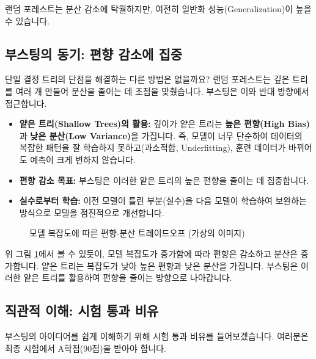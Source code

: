 \documentclass[11pt,a4paper]{book}
\theoremstyle{definition}
\begin{document}
랜덤 포레스트는 분산 감소에 탁월하지만, 여전히 일반화 성능(Generalization)이 높을 수 있습니다.

\subsection{부스팅의 동기: 편향 감소에 집중}
단일 결정 트리의 단점을 해결하는 다른 방법은 없을까요? 랜덤 포레스트는 깊은 트리를 여러 개 만들어 분산을 줄이는 데 초점을 맞췄습니다. 부스팅은 이와 반대 방향에서 접근합니다.

\begin{tcolorbox}[summary, title={부스팅의 핵심 동기}] %
\begin{itemize}
    \item \textbf{얕은 트리(Shallow Trees)의 활용:} 깊이가 얕은 트리는 \textbf{높은 편향(High Bias)}과 \textbf{낮은 분산(Low Variance)}을 가집니다. 즉, 모델이 너무 단순하여 데이터의 복잡한 패턴을 잘 학습하지 못하고(과소적합, Underfitting), 훈련 데이터가 바뀌어도 예측이 크게 변하지 않습니다.
    \item \textbf{편향 감소 목표:} 부스팅은 이러한 얕은 트리의 높은 편향을 줄이는 데 집중합니다.
    \item \textbf{실수로부터 학습:} 이전 모델이 틀린 부분(실수)을 다음 모델이 학습하여 보완하는 방식으로 모델을 점진적으로 개선합니다.
\end{itemize}
\end{tcolorbox}

\begin{figure}[h!]
    \centering
    \caption{모델 복잡도에 따른 편향-분산 트레이드오프 (가상의 이미지)}
    \label{fig:bias_variance_tradeoff}
\end{figure}

위 그림 \ref{fig:bias_variance_tradeoff}에서 볼 수 있듯이, 모델 복잡도가 증가함에 따라 편향은 감소하고 분산은 증가합니다. 얕은 트리는 복잡도가 낮아 높은 편향과 낮은 분산을 가집니다. 부스팅은 이러한 얕은 트리를 활용하여 편향을 줄이는 방향으로 나아갑니다.

\subsection{직관적 이해: 시험 통과 비유}
부스팅의 아이디어를 쉽게 이해하기 위해 시험 통과 비유를 들어보겠습니다. 여러분은 최종 시험에서 A학점(90점)을 받아야 합니다.
\end{document}
